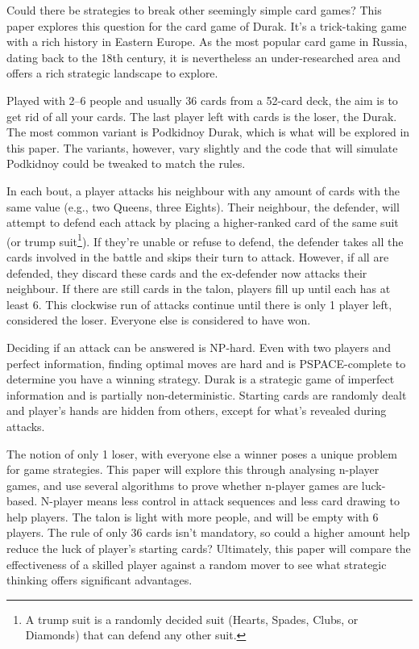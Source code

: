 \documentclass[a4paper, twoside, 12pt]{report}
\begin{document}
Could there be strategies to break other seemingly simple card games? This paper explores this question for the card game of Durak. It's a trick-taking game with a rich history in Eastern Europe. As the most popular card game in Russia, dating back to the 18th century\cite{penguin}, it is nevertheless an under-researched area and offers a rich strategic landscape to explore.

Played with 2--6 people and usually 36 cards from a 52-card deck, the aim is to get rid of all your cards. The last player left with cards is the loser, the Durak. The most common variant is Podkidnoy Durak, which is what will be explored in this paper. The variants, however, vary slightly and the code that will simulate Podkidnoy could be tweaked to match the rules.

In each bout, a player attacks his neighbour with any amount of cards with the same value (e.g., two Queens, three Eights). Their neighbour, the defender, will attempt to defend each attack by placing a higher-ranked card of the same suit (or trump suit\footnote{A trump suit is a randomly decided suit (Hearts, Spades, Clubs, or Diamonds) that can defend any other suit.}). If they're unable or refuse to defend, the defender takes all the cards involved in the battle and skips their turn to attack. However, if all are defended, they discard these cards and the ex-defender now attacks their neighbour. If there are still cards in the talon, players fill up until each has at least 6. This clockwise run of attacks continue until there is only 1 player left, considered the loser. Everyone else is considered to have won.

Deciding if an attack can be answered is NP-hard. Even with two players and perfect information, finding optimal moves are hard and is PSPACE-complete to determine you have a winning strategy\cite{bonnet}. Durak is a strategic game of imperfect information and is partially non-deterministic. Starting cards are randomly dealt and player’s hands are hidden from others, except for what’s revealed during attacks.

The notion of only 1 loser, with everyone else a winner poses a unique problem for game strategies. This paper will explore this through analysing n-player games, and use several algorithms to prove whether n-player games are luck-based. N-player means less control in attack sequences and less card drawing to help players. The talon is light with more people, and will be empty with 6 players. The rule of only 36 cards isn't mandatory, so could a higher amount help reduce the luck of player's starting cards? Ultimately, this paper will compare the effectiveness of a skilled player against a random mover to see what strategic thinking offers significant advantages.
\end{document}
